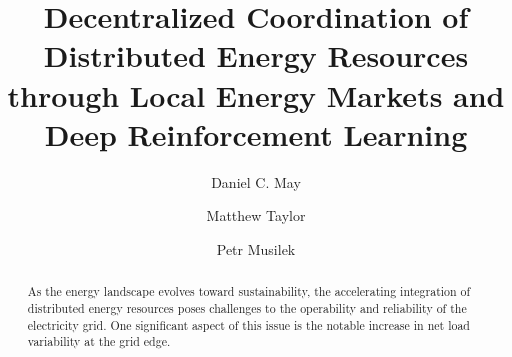 \documentclass[preprint, 12pt]{elsarticle}
\begin{document}
\begin{frontmatter}
%
\title{Decentralized Coordination of Distributed Energy Resources through Local Energy Markets and Deep Reinforcement Learning}
%
%
%

\author[inst1]{Daniel C. May}
            
\author[inst2]{Matthew Taylor}

\author[inst1,inst3]{Petr Musilek}







\begin{abstract}
As the energy landscape evolves toward sustainability, the accelerating integration of distributed energy resources poses challenges to the operability and reliability of the electricity grid. One significant aspect of this issue is the notable increase in net load variability at the grid edge.


\end{abstract}
\end{frontmatter}
\end{document}
